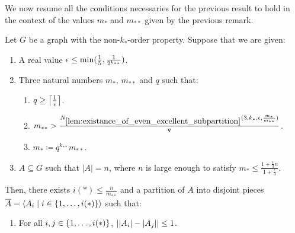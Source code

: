        We now resume all the conditions necessaries for the previous result to hold in the context of the values
        $m_*$ and $m_{**}$ given by the previous remark.

        \begin{lemma} \label{lem:resume_of_all_conditions_for_excellent_partitions}
            Let $G$ be a graph with the non-$k_{*}$-order property.
            Suppose that we are given:
            \begin{enumerate}
                \item A real value $\epsilon \leq \min ( \frac{1}{5}, \frac{1}{2^{k_{**}}} )$.
                \item Three natural numbers $m_*$, $m_{**}$ and $q$ such that:
                    \begin{enumerate}[label=(\alph*), ref=2.\alph*]
                        \item \label{itm:resume_of_all_conditions_for_excellent_partitions.a} $q \geq \left\lceil \frac{1}{\epsilon} \right\rceil$.
                        \item \label{itm:resume_of_all_conditions_for_excellent_partitions.b}
                            $m_{**} > \frac{N_{\ref{lem:existance_of_even_excellent_subpartition}}
                                ( 3, k_*, \epsilon, \frac{m_*}{m_{**}} )}{q}$.
                        \item \label{itm:resume_of_all_conditions_for_excellent_partitions.c} $m_* \coloneqq q^{k_{**}} m_{**}$.
                \end{enumerate}
                \item \label{itm:resume_of_all_conditions_for_excellent_partitions.3}
                    $A \subseteq G$ such that $|A| = n$, where $n$ is large enough to satisfy
                    $m_* \leq \frac{1 + \frac{\epsilon}{3}n}{1 + \frac{\epsilon}{3}}$.
            \end{enumerate}
            Then, there exists $i(*) \leq \frac{n}{m_{**}}$ and a partition of $A$ into disjoint pieces
            $\overline{A} = \left< A_i \mid i \in \{ 1, \dots, i(*) \} \right>$ such that:
            \begin{enumerate}[label=(\roman*), ref=\roman*]
                \item \label{itm:resume_of_all_conditions_for_excellent_partitions.i}
                    For all $i, j \in \{ 1, \dots, i(*) \}$, $| | A_i |- | A_j | | \leq 1$.

\end{enumerate}
\end{lemma}
